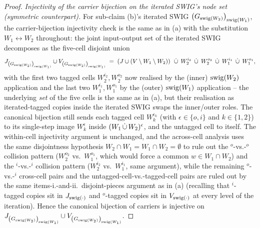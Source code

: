 \documentclass[main]{subfiles}
\begin{document}
\begin{proof}
\medskip\noindent\emph{Injectivity of the carrier bijection on the iterated SWIG's node set (symmetric counterpart).}
For sub-claim (b)'s iterated SWIG $\left ( G_{\mathrm{swig}(W_2)} \right )_{\mathrm{swig}(W_1)}$, the carrier-bijection injectivity check is the same as in (a) with the substitution $W_1 \leftrightarrow W_2$ throughout: the joint input-output set of the iterated SWIG decomposes as the five-cell disjoint union
\[
    J_{\left ( G_{\mathrm{swig}(W_2)} \right )_{\mathrm{swig}(W_1)}} \cup V_{\left ( G_{\mathrm{swig}(W_2)} \right )_{\mathrm{swig}(W_1)}}
    \;=\; \left ( J \cup (V \setminus W_1 \setminus W_2) \right ) \;\,\dot{\cup}\,\; W_2^{i_2} \;\,\dot{\cup}\,\; W_2^{o_2} \;\,\dot{\cup}\,\; W_1^{i_1} \;\,\dot{\cup}\,\; W_1^{o_1},
\]
with the first two tagged cells $W_2^{i_2}, W_2^{o_2}$ now realised by the (inner) $\mathrm{swig}(W_2)$ application and the last two $W_1^{i_1}, W_1^{o_1}$ by the (outer) $\mathrm{swig}(W_1)$ application -- the underlying \emph{set} of the five cells is the same as in (a), but their realisation as iterated-tagged copies inside the iterated SWIG swaps the inner/outer roles. The canonical bijection still sends each tagged cell $W_k^{\epsilon_k}$ (with $\epsilon \in \{o, i\}$ and $k \in \{1, 2\}$) to its single-step image $W_k^{\epsilon}$ inside $(W_1 \,\dot{\cup}\, W_2)^{\epsilon}$, and the untagged cell to itself. The within-cell injectivity argument is unchanged, and the across-cell analysis uses the same disjointness hypothesis $W_2 \cap W_1 = W_1 \cap W_2 = \emptyset$ to rule out the $^o$-vs.-$^o$ collision pattern ($W_2^{o_2}$ vs.\ $W_1^{o_1}$, which would force a common $w \in W_1 \cap W_2$) and the $^i$-vs.-$^i$ collision pattern ($W_2^{i_2}$ vs.\ $W_1^{i_1}$, same argument), while the remaining $^o$-vs.-$^i$ cross-cell pairs and the untagged-cell-vs.-tagged-cell pairs are ruled out by the same items-i.-and-ii.\ disjoint-pieces argument as in (a) (recalling that $^i$-tagged copies sit in $J_{\mathrm{swig}(\cdot)}$ and $^o$-tagged copies sit in $V_{\mathrm{swig}(\cdot)}$ at every level of the iteration). Hence the canonical bijection of carriers is injective on $J_{\left ( G_{\mathrm{swig}(W_2)} \right )_{\mathrm{swig}(W_1)}} \cup V_{\left ( G_{\mathrm{swig}(W_2)} \right )_{\mathrm{swig}(W_1)}}$. \checkmark


\end{proof}
\end{document}

